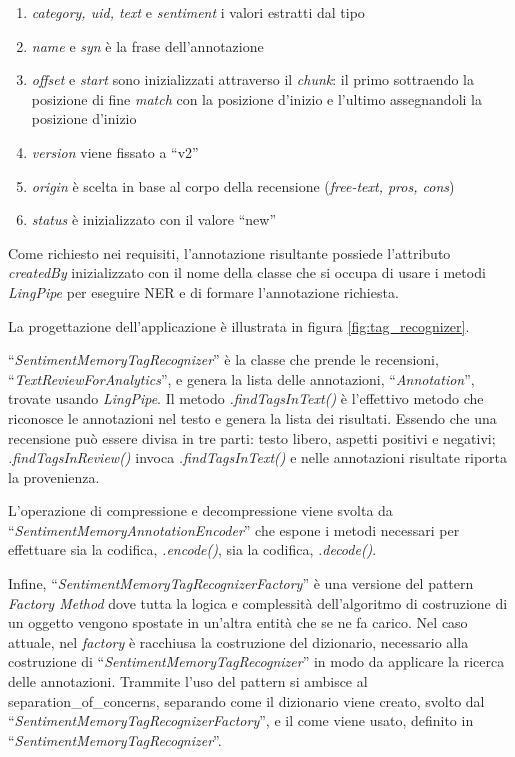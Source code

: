 \begin{enumerate}
\item \textit{category, uid, text} e \textit{sentiment} i valori estratti dal
tipo
\item \textit{name} e \textit{syn} è la frase dell'annotazione
\item \textit{offset} e \textit{start} sono inizializzati attraverso il
\textit{chunk}: il primo sottraendo la posizione di fine \textit{match} con la
posizione d'inizio e l'ultimo assegnandoli la posizione d'inizio
\item \textit{version} viene fissato a ``v2''
\item \textit{origin} è scelta in base al corpo della recensione 
(\textit{free-text, pros, cons})
\item \textit{status} è inizializzato con il valore ``new''
\end{enumerate}

Come richiesto nei requisiti, l'annotazione risultante possiede l'attributo
\textit{createdBy} inizializzato con il nome della classe che si occupa di
usare i metodi \textit{LingPipe} per eseguire \gls{NER} e di formare
l'annotazione richiesta.

La progettazione dell'applicazione è illustrata in figura
\ref{fig:tag_recognizer}.

``\textit{SentimentMemoryTagRecognizer}'' è la classe che prende le recensioni,
``\textit{TextReviewForAnalytics}'', e genera la lista delle annotazioni,
``\textit{Annotation}'', trovate usando \textit{LingPipe}. Il metodo
\textit{.findTagsInText()} è l'effettivo metodo che riconosce le annotazioni nel
testo e genera la lista dei risultati. Essendo che una recensione può essere
divisa in tre parti: testo libero, aspetti positivi e negativi;
\textit{.findTagsInReview()} invoca \textit{.findTagsInText()} e nelle
annotazioni risultate riporta la provenienza.

L'operazione di compressione e decompressione viene svolta da
``\textit{SentimentMemoryAnnotationEncoder}'' che espone i metodi necessari per
effettuare sia la codifica, \textit{.encode()}, sia la codifica,
\textit{.decode()}.

Infine, ``\textit{SentimentMemoryTagRecognizerFactory}'' è una versione del
pattern \textit{Factory Method} dove tutta la logica e complessità
dell'algoritmo di costruzione di un oggetto vengono spostate in un'altra entità
che se ne fa carico. Nel caso attuale, nel \textit{factory} è racchiusa la
costruzione del dizionario, necessario alla costruzione di
``\textit{SentimentMemoryTagRecognizer}'' in modo da applicare la ricerca delle
annotazioni. Trammite l'uso del pattern si ambisce al
\gls{separation_of_concerns}, separando come il dizionario viene creato, svolto
dal ``\textit{SentimentMemoryTagRecognizerFactory}'', e il come viene usato,
definito in ``\textit{SentimentMemoryTagRecognizer}''.

